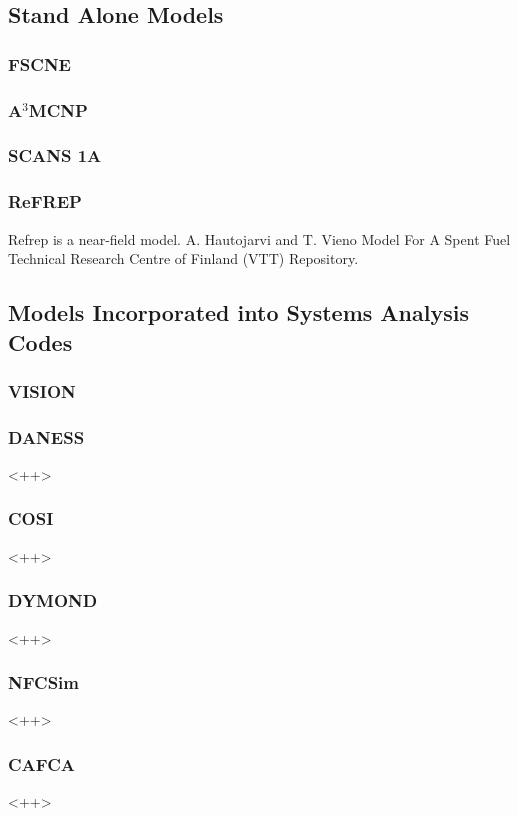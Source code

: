 \subsection{Stand Alone Models}
\subsubsection{FSCNE}

\subsubsection{A$^3$MCNP}

\subsubsection{SCANS 1A}

\subsubsection{ReFREP}
Refrep is a near-field model.  A. Hautojarvi and T. Vieno Model For A Spent Fuel Technical Research Centre of Finland (VTT) Repository.
\subsection{Models Incorporated into Systems Analysis Codes}
\subsubsection{VISION}
\subsubsection{DANESS}<++>
\subsubsection{COSI}<++>
\subsubsection{DYMOND}<++>
\subsubsection{NFCSim}<++>
\subsubsection{CAFCA}<++>
